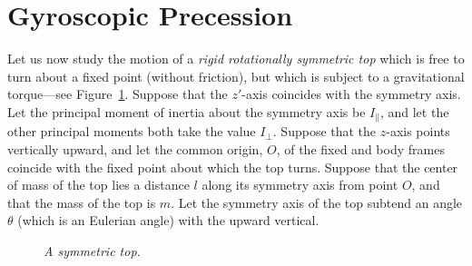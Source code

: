\section{Gyroscopic Precession}\label{sgyro}
Let us now study the motion of a {\em rigid rotationally symmetric top}\/ which
is free to turn about a fixed point (without friction), but which is
subject to a gravitational torque---see Figure~\ref{top}. Suppose that the $z'$-axis
coincides with the symmetry axis. Let the principal moment of inertia about the symmetry axis
be $I_\parallel$, and let the other principal moments both take the value $I_\perp$.
Suppose that the
$z$-axis points vertically upward, and let the common origin, $O$,  of  the
fixed and body frames coincide with the fixed point about which the top
turns. Suppose that
the center of mass of the top lies a distance $l$ along its symmetry axis from point $O$, and
that the mass of the top is $m$. Let the symmetry axis of the
top subtend an angle $\theta$ (which is an Eulerian angle) with
the upward vertical. 

\begin{figure}
\epsfysize=2.5in
\centerline{}
\caption{\em A symmetric top.}\label{top}
\end{figure}

